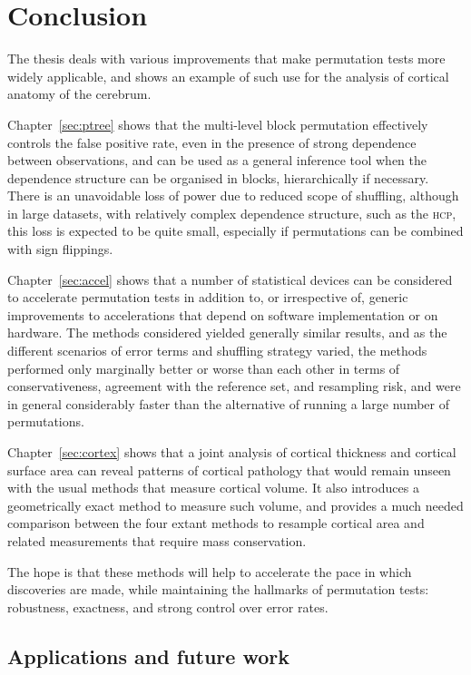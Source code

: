 \chapter{Conclusion}
\label{sec:conclusion}
\setstretch{\lspac}

The thesis deals with various improvements that make permutation tests more widely applicable, and shows an example of such use for the analysis of cortical anatomy of the cerebrum.

Chapter~\ref{sec:ptree} shows that the multi-level block permutation effectively controls the false positive rate, even in the presence of strong dependence between observations, and can be used as a general inference tool when the dependence structure can be organised in blocks, hierarchically if necessary. There is an unavoidable loss of power due to reduced scope of shuffling, although in large datasets, with relatively complex dependence structure, such as the \textsc{hcp}, this loss is expected to be quite small, especially if permutations can be combined with sign flippings.

Chapter~\ref{sec:accel} shows that a number of statistical devices can be considered to accelerate permutation tests in addition to, or irrespective of, generic improvements to accelerations that depend on software implementation or on hardware. The methods considered yielded generally similar results, and as the different scenarios of error terms and shuffling strategy varied, the methods performed only marginally better or worse than each other in terms of conservativeness, agreement with the reference set, and resampling risk, and were in general considerably faster than the alternative of running a large number of permutations.

Chapter~\ref{sec:cortex} shows that a joint analysis of cortical thickness and cortical surface area can reveal patterns of cortical pathology that would remain unseen with the usual methods that measure cortical volume. It also introduces a geometrically exact method to measure such volume, and provides a much needed comparison between the four extant methods to resample cortical area and related measurements that require mass conservation.

The hope is that these methods will help to accelerate the pace in which discoveries are made, while maintaining the hallmarks of permutation tests: robustness, exactness, and strong control over error rates.

\section{Applications and future work}


